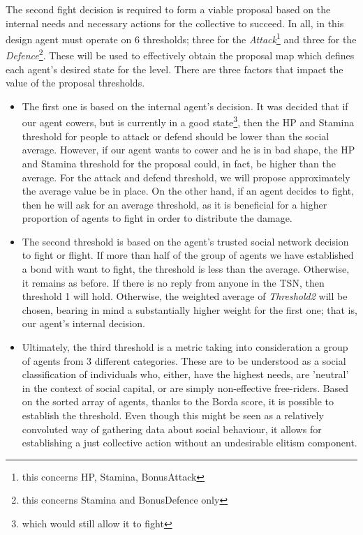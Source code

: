     The second fight decision is required to form a viable proposal based on the internal needs and necessary actions for the collective to succeed. In all, in this design agent must operate on 6 thresholds; three for the \textit{Attack}\footnote{this concerns HP, Stamina, BonusAttack} and three for the \textit{Defence}\footnote{this concerns Stamina and BonusDefence only}. These will be used to effectively obtain the proposal map which defines each agent's desired state for the level. There are three factors that impact the value of the proposal thresholds.
    
    \begin{itemize}
    \item The first one is based on the internal agent's decision. 
    It was decided that if our agent cowers, but is currently in a good state\footnote{which would still allow it to fight}, then the HP and Stamina threshold for people to attack or defend should be lower than the social average. However, if our agent wants to cower and he is in bad shape, the HP and Stamina threshold for the proposal could, in fact, be higher than the average. For the attack and defend threshold, we will propose approximately the average value be in place.
    On the other hand, if an agent decides to fight, then he will ask for an average threshold, as it is beneficial for a higher proportion of agents to fight in order to distribute the damage.

    \item The second threshold is based on the agent's trusted social network decision to fight or flight. If more than half of the group of agents we have established a bond with want to fight, the threshold is less than the average. Otherwise, it remains as before. If there is no reply from anyone in the TSN, then threshold 1 will hold. Otherwise, the weighted average of \textit{Threshold2} will be chosen, bearing in mind a substantially higher weight for the first one; that is, our agent's internal decision.
    
    \item Ultimately, the third threshold is a metric taking into consideration a group of agents from 3 different categories. These are to be understood as a social classification of individuals who, either, have the highest needs, are 'neutral' in the context of social capital, or are simply non-effective free-riders. 
    Based on the sorted array of agents, thanks to the Borda score, it is possible to establish the threshold. Even though this might be seen as a relatively convoluted way of gathering data about social behaviour, it allows for establishing a just collective action without an undesirable elitism component.
    \end{itemize}

